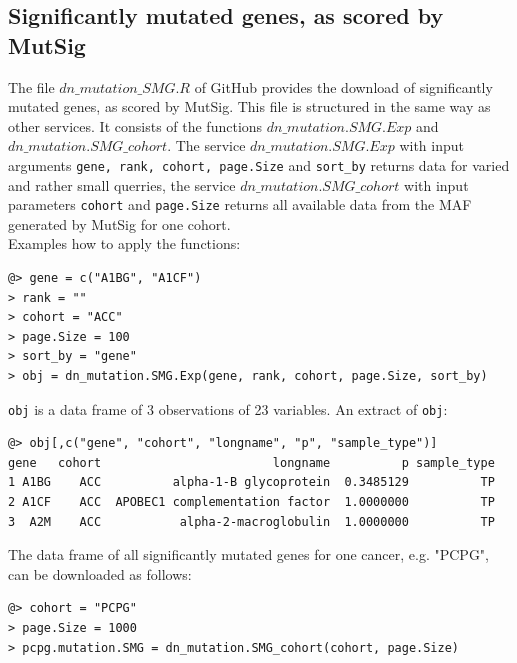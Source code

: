 \documentclass{TechReport}
\begin{document}
\subsection{Significantly mutated genes, as scored by MutSig}
The file $dn\_mutation\_SMG.R$ of GitHub provides the download of significantly
mutated genes, as scored by MutSig. This file is structured in the same way as other 
services. It consists of the functions 
$dn\_mutation.SMG.Exp$ and $dn\_mutation.SMG\_cohort$. The service 
$dn\_mutation.SMG.Exp$ with input arguments {\tt gene, rank, cohort, page.Size} and
{\tt sort\_by} returns data for varied and rather small querries, the service
$dn\_mutation.SMG\_cohort$ with input parameters {\tt cohort} and {\tt page.Size} 
returns all available data from the MAF generated by
MutSig for one cohort.\\
Examples how to apply the functions:
\begin{lstlisting}[style=base]
@> gene = c("A1BG", "A1CF")
> rank = ""
> cohort = "ACC"
> page.Size = 100
> sort_by = "gene"
> obj = dn_mutation.SMG.Exp(gene, rank, cohort, page.Size, sort_by)
\end{lstlisting}
{\tt obj} is a data frame of 3 observations of 23 variables. An extract of {\tt obj}:
\begin{lstlisting}[style=base]
@> obj[,c("gene", "cohort", "longname", "p", "sample_type")]
gene   cohort                        longname          p sample_type
1 A1BG    ACC          alpha-1-B glycoprotein  0.3485129          TP
2 A1CF    ACC  APOBEC1 complementation factor  1.0000000          TP
3  A2M    ACC           alpha-2-macroglobulin  1.0000000          TP
\end{lstlisting}
The data frame of all significantly mutated genes for one cancer, e.g. "PCPG", 
can be downloaded as follows:
\begin{lstlisting}[style=base]
@> cohort = "PCPG"
> page.Size = 1000
> pcpg.mutation.SMG = dn_mutation.SMG_cohort(cohort, page.Size)
\end{lstlisting}
\end{document}
